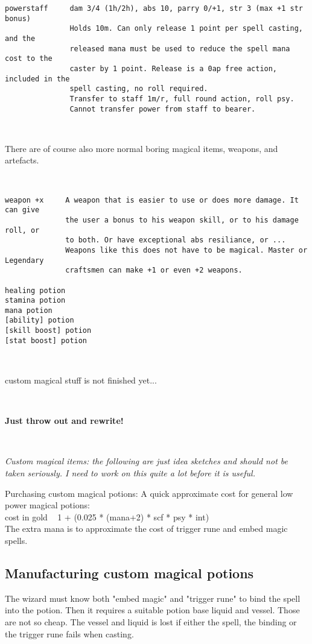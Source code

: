 \begin{verbatim}
powerstaff     dam 3/4 (1h/2h), abs 10, parry 0/+1, str 3 (max +1 str bonus)
               Holds 10m. Can only release 1 point per spell casting, and the
               released mana must be used to reduce the spell mana cost to the
               caster by 1 point. Release is a 0ap free action, included in the
               spell casting, no roll required.
               Transfer to staff 1m/r, full round action, roll psy.
               Cannot transfer power from staff to bearer.
\end{verbatim} \normalsize

\

There are of course also more normal boring magical items, weapons, and artefacts.

\

\small \begin{verbatim}
weapon +x     A weapon that is easier to use or does more damage. It can give
              the user a bonus to his weapon skill, or to his damage roll, or
              to both. Or have exceptional abs resiliance, or ...
              Weapons like this does not have to be magical. Master or Legendary
              craftsmen can make +1 or even +2 weapons.

healing potion
stamina potion
mana potion
[ability] potion
[skill boost] potion
[stat boost] potion
\end{verbatim} \normalsize

\

\clearpage
\TODO custom magical stuff is not finished yet... 

\

\textbf{Just throw out and rewrite!}

\

\emph{Custom magical items: the following are just idea sketches and should not be taken seriously. I need to work on this quite a lot before it is useful.}

Purchasing custom magical potions: A quick approximate cost for general low power magical potions: \\
cost in gold ~ 1 + (0.025 * (mana+2) * scf * psy * int) \\
The extra mana is to approximate the cost of trigger rune and embed magic spells.


\subsection*{Manufacturing custom magical potions}
The wizard must know both "embed magic" and "trigger rune" to bind the spell into the potion. Then it requires a suitable potion base liquid and vessel. Those are not so cheap. The vessel and liquid is lost if either the spell, the binding or the trigger rune fails when casting.

